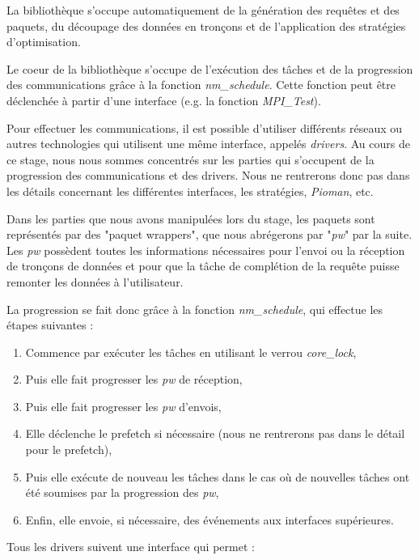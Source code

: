 La bibliothèque s'occupe automatiquement de la génération des requêtes et des paquets,
du découpage des données en tronçons et de l'application des stratégies d'optimisation.

Le coeur de la bibliothèque s'occupe de l'exécution des tâches et de la progression des communications grâce à la fonction \emph{nm_schedule}.
Cette fonction peut être déclenchée à partir d'une interface (e.g. la fonction \emph{MPI_Test}).

Pour effectuer les communications, il est possible d'utiliser différents réseaux ou autres technologies qui utilisent une même interface, appelés \emph{drivers}. %
Au cours de ce stage, nous nous sommes concentrés sur les parties qui s'occupent de la progression des communications et des drivers.
Nous ne rentrerons donc pas dans les détails concernant les différentes interfaces, les stratégies, \emph{Pioman}, etc.

Dans les parties que nous avons manipulées lors du stage, les paquets sont représentés par des "paquet wrappers",
que nous abrégerons par "\emph{pw}" par la suite.
Les \emph{pw} possèdent toutes les informations nécessaires pour l'envoi ou la réception de tronçons de données et
pour que la tâche de complétion de la requête puisse remonter les données à l'utilisateur.

La progression se fait donc grâce à la fonction \emph{nm_schedule}, qui effectue les étapes suivantes :

\begin{enumerate}
  \item Commence par exécuter les tâches en utilisant le verrou \emph{core_lock},
  \item Puis elle fait progresser les \emph{pw} de réception,
  \item Puis elle fait progresser les \emph{pw} d'envois,
  \item Elle déclenche le prefetch si nécessaire (nous ne rentrerons pas dans le détail pour le prefetch),
  \item Puis elle exécute de nouveau les tâches dans le cas où de nouvelles tâches ont été soumises par la progression des \emph{pw},
  \item Enfin, elle envoie, si nécessaire, des événements aux interfaces supérieures.
\end{enumerate}

Tous les drivers suivent une interface qui permet :

